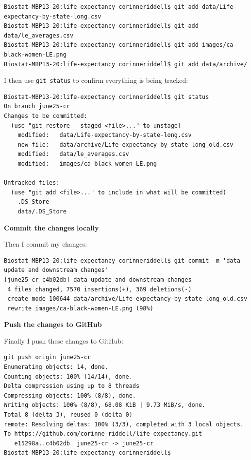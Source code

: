 \documentclass[
]{book}
\begin{document}
\begin{verbatim}
Biostat-MBP13-20:life-expectancy corinneriddell$ git add data/Life-expectancy-by-state-long.csv 
Biostat-MBP13-20:life-expectancy corinneriddell$ git add data/le_averages.csv 
Biostat-MBP13-20:life-expectancy corinneriddell$ git add images/ca-black-women-LE.png 
Biostat-MBP13-20:life-expectancy corinneriddell$ git add data/archive/
\end{verbatim}

I then use \texttt{git\ status} to confirm everything is being tracked:

\begin{verbatim}
Biostat-MBP13-20:life-expectancy corinneriddell$ git status
On branch june25-cr
Changes to be committed:
  (use "git restore --staged <file>..." to unstage)
    modified:   data/Life-expectancy-by-state-long.csv
    new file:   data/archive/Life-expectancy-by-state-long_old.csv
    modified:   data/le_averages.csv
    modified:   images/ca-black-women-LE.png

Untracked files:
  (use "git add <file>..." to include in what will be committed)
    .DS_Store
    data/.DS_Store
\end{verbatim}

\textbf{Commit the changes locally}

Then I commit my changes:

\begin{verbatim}
Biostat-MBP13-20:life-expectancy corinneriddell$ git commit -m 'data update and downstream changes'
[june25-cr c4b02db] data update and downstream changes
 4 files changed, 7570 insertions(+), 369 deletions(-)
 create mode 100644 data/archive/Life-expectancy-by-state-long_old.csv
 rewrite images/ca-black-women-LE.png (98%)
\end{verbatim}

\textbf{Push the changes to GitHub}

Finally I push these changes to GitHub:

\begin{verbatim}
git push origin june25-cr
Enumerating objects: 14, done.
Counting objects: 100% (14/14), done.
Delta compression using up to 8 threads
Compressing objects: 100% (8/8), done.
Writing objects: 100% (8/8), 68.08 KiB | 9.73 MiB/s, done.
Total 8 (delta 3), reused 0 (delta 0)
remote: Resolving deltas: 100% (3/3), completed with 3 local objects.
To https://github.com/corinne-riddell/life-expectancy.git
   e15298a..c4b02db  june25-cr -> june25-cr
Biostat-MBP13-20:life-expectancy corinneriddell$ 
\end{verbatim}
\end{document}
